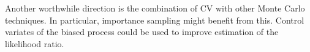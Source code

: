 Another worthwhile direction is the combination of \ac{CV} with other Monte Carlo techniques.
In particular, importance sampling might benefit from this.
Control variates of the biased process could be used to improve estimation of the likelihood ratio.

